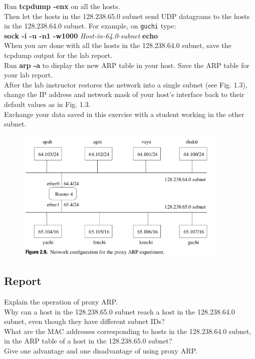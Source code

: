 \documentclass[10pt,a4paper]{article}
\numberwithin{equation}{section}
\numberwithin{figure}{section}
\numberwithin{table}{section}
\begin{document}
    Run \textbf{tcpdump -enx} on all the hosts. \\
    Then let the hosts in the 128.238.65.0 subnet send UDP datagrams to the hosts in the 128.238.64.0 subnet.
    For example, on \texttt{guchi} type: \\
    \textbf{sock -i -u -n1 -w1000} \textit{Host-in-64.0-subnet} \textbf{echo} \\
    When you are done with all the hosts in the 128.238.64.0 subnet, save the tcpdump output for the lab report. \\
    Run \textbf{arp -a} to display the new ARP table in your host.
    Save the ARP table for your lab report. \\
    After the lab instructor restores the network into a single subnet (see Fig. 1.3), change the IP address and network mask of your host’s interface back to their default values as in Fig. 1.3. \\
    Exchange your data saved in this exercise with a student working in the other subnet. \\
    \begin{figure}[H]
        \centering
        \includegraphics[width=0.9\textwidth]{img/figure2-9.png}
    \end{figure}
    \subsection*{Report}
    Explain the operation of proxy ARP. \\
    Why can a host in the 128.238.65.0 subnet reach a host in the 128.238.64.0 subnet, even though they have different subnet IDs? \\
    What are the MAC addresses corresponding to hosts in the 128.238.64.0 subnet, in the ARP table of a host in the 128.238.65.0 subnet? \\
    Give one advantage and one disadvantage of using proxy ARP.
\end{document}
